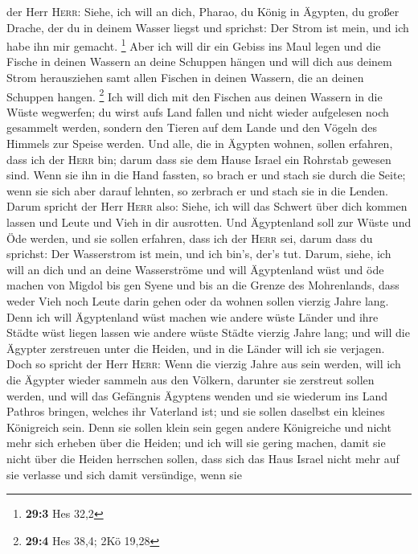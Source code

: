 der Herr \textsc{Herr}: Siehe, ich will an dich, Pharao, du König in
Ägypten, du großer Drache, der du in deinem Wasser liegst und sprichst:
Der Strom ist mein, und ich habe ihn mir gemacht. \footnote{\textbf{29:3}
  Hes 32,2}  Aber ich will dir ein Gebiss ins Maul legen
und die Fische in deinen Wassern an deine Schuppen hängen und will dich
aus deinem Strom herausziehen samt allen Fischen in deinen Wassern, die
an deinen Schuppen hangen. \footnote{\textbf{29:4} Hes 38,4; 2Kö 19,28}
 Ich will dich mit den Fischen aus deinen Wassern in die
Wüste wegwerfen; du wirst aufs Land fallen und nicht wieder aufgelesen
noch gesammelt werden, sondern den Tieren auf dem Lande und den Vögeln
des Himmels zur Speise werden.  Und alle, die in Ägypten
wohnen, sollen erfahren, dass ich der \textsc{Herr} bin; darum dass sie
dem Hause Israel ein Rohrstab gewesen sind.  Wenn sie ihn
in die Hand fassten, so brach er und stach sie durch die Seite; wenn sie
sich aber darauf lehnten, so zerbrach er und stach sie in die Lenden.
 Darum spricht der Herr \textsc{Herr} also: Siehe, ich
will das Schwert über dich kommen lassen und Leute und Vieh in dir
ausrotten.  Und Ägyptenland soll zur Wüste und Öde werden,
und sie sollen erfahren, dass ich der \textsc{Herr} sei, darum dass du
sprichst: Der Wasserstrom ist mein, und ich bin's, der's tut.
 Darum, siehe, ich will an dich und an deine Wasserströme
und will Ägyptenland wüst und öde machen von Migdol bis gen Syene und
bis an die Grenze des Mohrenlands,  dass weder Vieh noch
Leute darin gehen oder da wohnen sollen vierzig Jahre lang.
 Denn ich will Ägyptenland wüst machen wie andere wüste
Länder und ihre Städte wüst liegen lassen wie andere wüste Städte
vierzig Jahre lang; und will die Ägypter zerstreuen unter die Heiden,
und in die Länder will ich sie verjagen.  Doch so spricht
der Herr \textsc{Herr}: Wenn die vierzig Jahre aus sein werden, will ich
die Ägypter wieder sammeln aus den Völkern, darunter sie zerstreut
sollen werden,  und will das Gefängnis Ägyptens wenden
und sie wiederum ins Land Pathros bringen, welches ihr Vaterland ist;
und sie sollen daselbst ein kleines Königreich sein. 
Denn sie sollen klein sein gegen andere Königreiche und nicht mehr sich
erheben über die Heiden; und ich will sie gering machen, damit sie nicht
über die Heiden herrschen sollen,  dass sich das Haus
Israel nicht mehr auf sie verlasse und sich damit versündige, wenn sie

